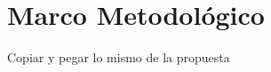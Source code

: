 \chapter{Marco Metodol\'ogico}
\label{chap:marcometodologico}

Copiar y pegar lo mismo de la propuesta

\newpage
